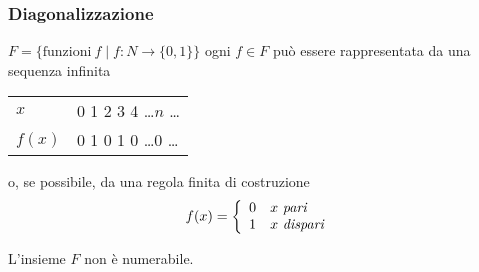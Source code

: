 \subsubsection{Diagonalizzazione}

$F = \{\mathrm{funzioni}\ f \mid f: N \rightarrow \{0,1\}\}$ ogni $f \in F$ può essere rappresentata da una sequenza infinita
\begin{table}[H]
    \centering
    \begin{tabular}{l l}
        $x$    & 0 1 2 3 4 \dots $n$ \dots \\
        $f(x)$ & 0 1 0 1 0 \dots 0 \dots   \\
    \end{tabular}
\end{table}
\noindent o, se possibile, da una regola finita di costruzione
\[ f(x) = \left\{\begin{array}{l l}
        0 & x\ \mathit{pari}    \\
        1 & x\ \mathit{dispari} \\
    \end{array}\right.\]

\begin{theorem}
    L'insieme $F$ non è numerabile.
\end{theorem}

